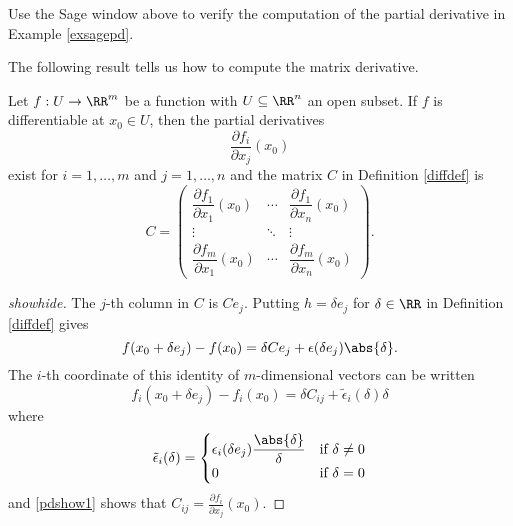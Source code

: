 \documentclass{article}
\begin{document}
\beginshex
Use the Sage window above to verify the computation of the partial
derivative in Example \ref{exsagepd}.
\endshex

The following result tells us how to compute the matrix derivative.

\begin{proposition}[emph]\label{proppd}
  Let $f:U\rightarrow \RR^m$ be a function with $U\subseteq \RR^n$ an
  open subset. If $f$ is differentiable at $x_0\in U$, then the
  partial derivatives
  \begin{equation*}
    \frac{\partial f_i}{\partial x_j}(x_0)
  \end{equation*}
  exist for $i = 1, \dots, m$ and $j = 1, \dots, n$ and the matrix $C$
  in Definition \ref{diffdef} is
  \begin{equation*}
    C =
    \begin{pmatrix}
      \dfrac{\partial f_1}{\partial x_1}(x_0) & \cdots &
      \dfrac{\partial f_1}{\partial x_n}(x_0)\\
      \vdots & \ddots & \vdots \\
      \dfrac{\partial f_m}{\partial x_1}(x_0) & \cdots &
      \dfrac{\partial f_m}{\partial x_n}(x_0)
    \end{pmatrix}.
  \end{equation*}
\end{proposition}
  \begin{proof}[showhide]
    The $j$-th column in $C$ is $C e_j$. Putting $h = \delta e_j$ for
  $\delta\in \RR$ in Definition \ref{diffdef} gives
  \begin{equation*}
    f(x_0 + \delta e_j) - f(x_0) = \delta C e_j + \epsilon(\delta e_j)
    \abs{ \delta }.
  \end{equation*}
  The $i$-th coordinate of this identity of $m$-dimensional vectors
  can be written
  \begin{equation}\label{pdshow1}
    f_i(x_0 + \delta e_j) - f_i(x_0) = \delta C_{i j} + \tilde{\epsilon}_i(\delta)
    \delta
  \end{equation}
  where
  \begin{equation*}
    \tilde{\epsilon}_i(\delta) = 
    \begin{cases}
      \epsilon_i(\delta e_j) \dfrac{\abs{ \delta }}{\delta} &\text{if } \delta\neq 0 \\
      0 &\text{if } \delta = 0
    \end{cases}
  \end{equation*}
  and \eqref{pdshow1} shows that $C_{ij} = \frac{\partial f_i}{\partial x_j}(x_0)$.
    \end{proof}
\end{document}
